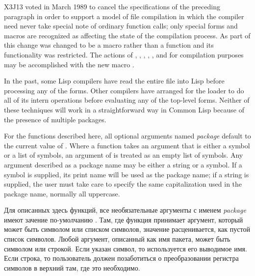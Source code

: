 \begin{newer}
X3J13 voted in March 1989 
to cancel the specifications of the preceding paragraph
in order to support a model of file compilation in which the
compiler need never take special note of ordinary function calls;
only special forms and macros are recognized as affecting the state
of the compilation process.
As part of this change  was changed to be a macro
rather than a function and its functionality was restricted.
The actions of
, , ,
, , and  for compilation
purposes may be accomplished with the new macro .
\end{newer}

\beforenoterule
\begin{implementation}
In the past, some Lisp compilers have read
the entire file into Lisp before processing any of the forms.  
Other compilers have arranged for
the loader to do all of its intern operations before evaluating any of the
top-level forms.  Neither of these techniques will work in a
straightforward way in Common Lisp because of the presence of multiple
packages.
\end{implementation}
\afternoterule

For the functions described here, all optional arguments named
\emph{package} default to the current value of .  Where a
function takes an argument that is either a symbol or a list of symbols,
an argument of {\false} is treated as an empty list of symbols.  Any
argument described as a package name may be either a string or a symbol.
If a symbol is supplied, its print name will be used as the package
name; if a string is supplied, the user must take care to specify the
same capitalization used in the package name, normally all uppercase.

Для описанных здесь функций, все необязательные аргументы с именем
\emph{package} имеют зачение по-умолчанию . Там, где функция
принимает аргумент, который может быть символом или списком символов, значение
{\false} расценивается, как пустой список символов. Любой аргумент, описанный
как имя пакета, может быть символом или строкой.
Если указан символ, то используется его выводимое имя. Если строка, то
пользователь должен позаботиться о преобразовании регистра символов в верхний
там, где это необходимо.

